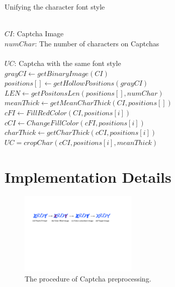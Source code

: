     \begin{algorithm}[!t]
        \centering
        \caption{Unifying the character font style}
        \label{alg:unify_font_style}
        \begin{algorithmic}[1]
            \REQUIRE~~\\
                $CI$: Captcha Image  \\
                $numChar$: The number of characters on Captchas\\
            \ENSURE~~\\
                $UC$: Captcha with the same font style \\
            \STATE $grayCI \leftarrow getBinaryImage(CI)$ \\
            \STATE $positions[] \leftarrow getHollowPositions(grayCI)$ \\
            \STATE $LEN \leftarrow getPositonsLen(positions[], numChar)$ \\
            \STATE $meanThick \leftarrow getMeanCharThick(CI, positions[])$ \\
                \STATE $cFI \leftarrow FillRedColor(CI, positions[i])$ \\
                \STATE $cCI \leftarrow ChangeFillColor(cFI, positions[i])$ \\
                \STATE $charThick \leftarrow getCharThick(cCI, positions[i])$ \\
                    \STATE $UC=cropChar(cCI, positions[i], meanThick)$ \\
                \ENDIF
            \ENDFOR
        \end{algorithmic}
    \end{algorithm}
\section{Implementation Details}


\begin{figure}
  \centering
  \includegraphics[width=0.5\textwidth]{fig/fill_color.pdf}
  \caption{The procedure of Captcha preprocessing.}
  \label{fig:fill_color}
\end{figure}

